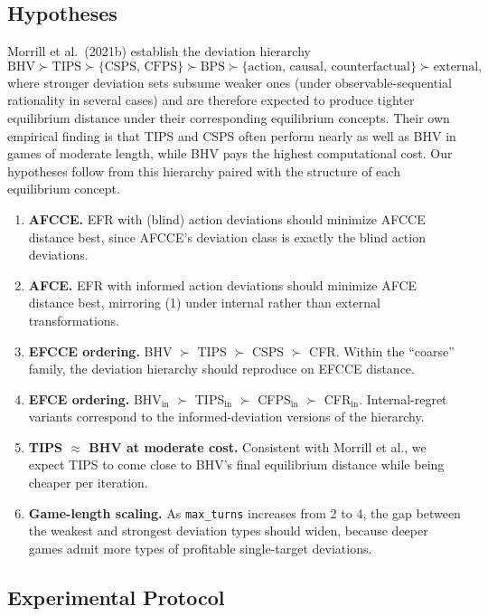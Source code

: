 \documentclass[11pt]{article}
\begin{document}
\subsection{Hypotheses}
\label{sec:hypotheses}

Morrill et al.~(2021b) establish the deviation hierarchy
\[
\text{BHV} \succ \text{TIPS} \succ \{\text{CSPS, CFPS}\} \succ \text{BPS} \succ \{\text{action, causal, counterfactual}\} \succ \text{external},
\]
where stronger deviation sets subsume weaker ones (under observable-sequential rationality in several cases) and are therefore expected to produce tighter equilibrium distance under their corresponding equilibrium concepts. Their own empirical finding is that TIPS and CSPS often perform nearly as well as BHV in games of moderate length, while BHV pays the highest computational cost. Our hypotheses follow from this hierarchy paired with the structure of each equilibrium concept.

\begin{enumerate}
    \item \textbf{AFCCE.} EFR with (blind) action deviations should minimize AFCCE distance best, since AFCCE's deviation class is exactly the blind action deviations.
    \item \textbf{AFCE.} EFR with informed action deviations should minimize AFCE distance best, mirroring (1) under internal rather than external transformations.
    \item \textbf{EFCCE ordering.} BHV $\succ$ TIPS $\succ$ CSPS $\succ$ CFR. Within the ``coarse'' family, the deviation hierarchy should reproduce on EFCCE distance.
    \item \textbf{EFCE ordering.} BHV$_\text{in}$ $\succ$ TIPS$_\text{in}$ $\succ$ CFPS$_\text{in}$ $\succ$ CFR$_\text{in}$. Internal-regret variants correspond to the informed-deviation versions of the hierarchy.
    \item \textbf{TIPS $\approx$ BHV at moderate cost.} Consistent with Morrill et al., we expect TIPS to come close to BHV's final equilibrium distance while being cheaper per iteration.
    \item \textbf{Game-length scaling.} As \texttt{max\_turns} increases from 2 to 4, the gap between the weakest and strongest deviation types should widen, because deeper games admit more types of profitable single-target deviations.
\end{enumerate}

\subsection{Experimental Protocol}
\end{document}
